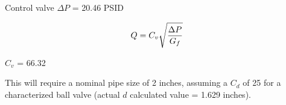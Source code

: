 \vskip 10pt

Control valve $\Delta P$ = 20.46 PSID

$$Q = C_v \sqrt{\Delta P \over G_f}$$

$C_v$ = 66.32

\vskip 10pt

This will require a nominal pipe size of 2 inches, assuming a $C_d$ of 25 for a characterized ball valve (actual $d$ calculated value = 1.629 inches).




